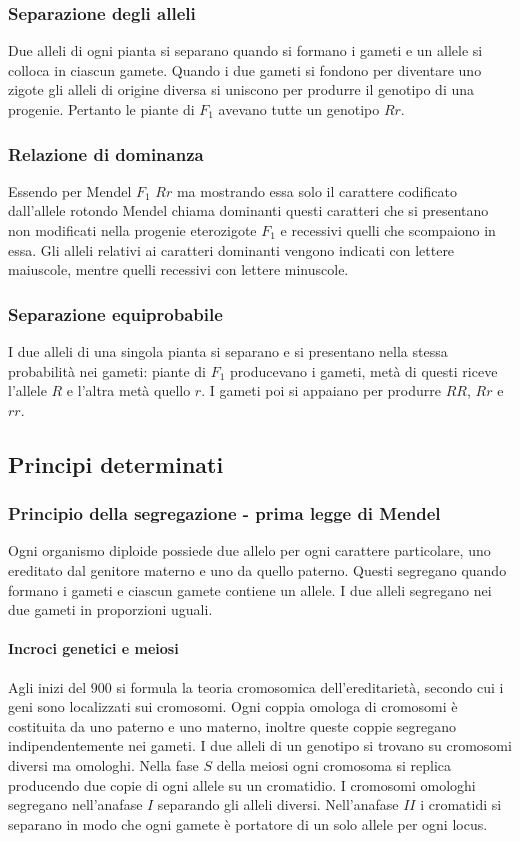\subsubsection{Separazione degli alleli}
Due alleli di ogni pianta si separano quando si formano i gameti e un allele si colloca in ciascun gamete. Quando i due gameti si fondono per diventare uno zigote gli alleli di origine diversa si 
uniscono per produrre il genotipo di una progenie. Pertanto le piante di $F_1$ avevano tutte un genotipo $Rr$. 
\subsubsection{Relazione di dominanza}
Essendo per Mendel $F_1$ $Rr$ ma mostrando essa solo il carattere codificato dall'allele rotondo Mendel chiama dominanti questi caratteri che si presentano non modificati nella progenie eterozigote $F_1$
e recessivi quelli che scompaiono in essa. Gli alleli relativi ai caratteri dominanti vengono indicati con lettere maiuscole, mentre quelli recessivi con lettere minuscole. 
\subsubsection{Separazione equiprobabile}
I due alleli di una singola pianta si separano e si presentano nella stessa probabilit\`a nei gameti: piante di $F_1$ producevano i gameti, met\`a di questi riceve l'allele $R$ e l'altra met\`a quello $r$.
I gameti poi si appaiano per produrre $RR$, $Rr$ e $rr$. 
\subsection{Principi determinati}
\subsubsection{Principio della segregazione - prima legge di Mendel}
Ogni organismo diploide possiede due allelo per ogni carattere particolare, uno ereditato dal genitore materno e uno da quello paterno. Questi segregano quando formano i gameti e ciascun gamete 
contiene un allele. I due alleli segregano nei due gameti in proporzioni uguali.
\paragraph{Incroci genetici e meiosi}
Agli inizi del $900$ si formula la teoria cromosomica dell'ereditariet\`a, secondo cui i geni sono localizzati sui cromosomi. Ogni coppia omologa di cromosomi \`e costituita da uno paterno e uno materno,
inoltre queste coppie segregano indipendentemente nei gameti. I due alleli di un genotipo si trovano su cromosomi diversi ma omologhi. Nella fase $S$ della meiosi ogni cromosoma si replica producendo
due copie di ogni allele su un cromatidio. I cromosomi omologhi segregano nell'anafase $I$ separando gli alleli diversi. Nell'anafase $II$ i cromatidi si separano in modo che ogni gamete \`e portatore
di un solo allele per ogni locus. 
